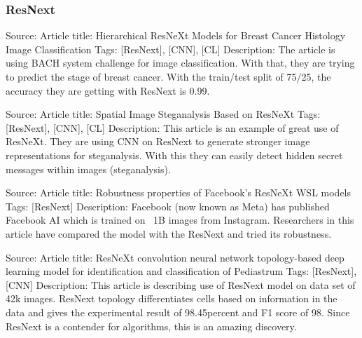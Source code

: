 \subsubsection{ResNext}
Source: \parencite{kone2018hierarchical}
\newline
Article title: Hierarchical ResNeXt Models for Breast Cancer Histology Image Classification
\newline
Tags: [ResNext], [CNN], [CL]
\newline
Description:
\newline
The article is using BACH system challenge for image classification. With that, they are trying to predict the stage of breast cancer. With the train/test split of 75/25, the accuracy they are getting with ResNext is 0.99.
\newline

Source: \parencite{sharma2018spatial}
\newline
Article title: Spatial Image Steganalysis Based on ResNeXt 
\newline
Tags: [ResNext], [CNN], [CL]
\newline
Description:
\newline
This article is an example of great use of ResNeXt. They are using CNN on ResNext to generate stronger image representations for steganalysis. With this they can easily detect hidden secret messages within images (steganalysis).
\newline

Source: \parencite{orhan2019robustness}
\newline
Article title: Robustness properties of Facebook's ResNeXt WSL models 
\newline
Tags: [ResNext]
Description:
\newline
Facebook (now known as Meta) has published Facebook AI which is trained on ~1B images from Instagram. Researchers in this article have compared the model with the ResNext and tried its robustness.
\newline

Source: \parencite{pant2020resnext}
\newline
Article title: ResNeXt convolution neural network topology-based deep learning model for identification and classification of Pediastrum
\newline
Tags: [ResNext], [CNN]
\newline
Description:
\newline
This article is describing use of ResNext model on data set of 42k images. ResNext topology differentiates cells based on information in the data and gives the experimental result of 98.45percent and F1 score of 98. Since ResNext is a contender for algorithms, this is an amazing discovery.